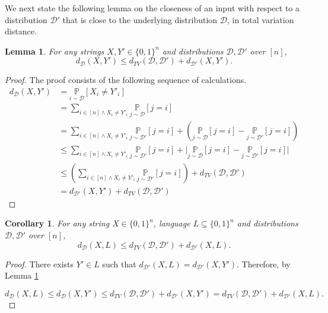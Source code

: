 \documentclass[11pt]{article}
\newtheorem{lemma}[theorem]{Lemma}
\newtheorem{corollary}[theorem]{Corollary}
\newcommand{\sD}{\mathcal{D}}
\begin{document}
We next state the following lemma on the closeness of an input with respect to a distribution $\sD'$ that is close to the underlying distribution $\sD$, in total variation distance.
\begin{lemma}\label{tvineq}
For any strings $X,Y' \in\{0,1\}^{n}$ and distributions $\mathcal{D}, \mathcal{D}'$ over $[n]$,
\begin{equation*}
    d_{\mathcal{D}}(X,Y')\leq d_{TV}(\mathcal{D},\mathcal{D}')+d_{\mathcal{D}'}(X,Y').
\end{equation*}
\end{lemma}

\begin{proof} The proof consists of the following sequence of calculations.
\[
\begin{split}
    d_{\mathcal{D}}(X,Y') &= \underset{i\sim\mathcal{D}}{\mathbb{P}}\left [X_{i}\neq Y'_{i}\right]\\
    &= \sum_{i\in [n]\wedge X_{i}\neq Y'_{i}}\underset{j\sim\mathcal{D}}{\mathbb{P}}\left[j=i\right]\\
    &= \sum_{i\in [n]\wedge X_{i}\neq Y'_{i}}\underset{j\sim\mathcal{D}'}{\mathbb{P}}\left[j=i\right] + \left( \underset{j\sim\mathcal{D}}{\mathbb{P}}\left[j=i\right]-\underset{j\sim\mathcal{D}'}{\mathbb{P}}\left[j=i\right] \right)\\
    &\leq \sum_{i\in [n]\wedge X_{i}\neq Y'_{i}}\underset{j\sim\mathcal{D}'}{\mathbb{P}}\left[j=i\right] +\bigg\vert\underset{j\sim\mathcal{D}}{\mathbb{P}}\left[j=i\right]-\underset{j\sim\mathcal{D}'}{\mathbb{P}}\left[j=i\right]\bigg\vert\\
    &\leq \left( \sum_{i\in [n]\wedge X_{i}\neq Y'_{i}}\underset{j\sim\mathcal{D}'}{\mathbb{P}}\left[j=i\right]\right) +d_{TV}(\mathcal{D},\mathcal{D}')\\
    &= d_{\mathcal{D}'}(X,Y')+d_{TV}(\mathcal{D},\mathcal{D}')
\end{split}
\]
\end{proof}

\begin{corollary}\label{tvineqLang}
    For any string $X \in\{0,1\}^{n}$, language $L\subseteq\{0,1\}^{n}$ and distributions $\mathcal{D}, \mathcal{D}'$ over $[n]$,
\begin{equation*}
    d_{\mathcal{D}}(X,L)\leq d_{TV}(\mathcal{D},\mathcal{D}')+d_{\mathcal{D}'}(X,L).
\end{equation*}
\end{corollary}

\begin{proof}
    There exists $Y'\in L$ such that $d_{\mathcal{D}'}(X,L)=d_{\mathcal{D}'}(X,Y')$. Therefore, by Lemma \ref{tvineq}

    \begin{equation*}
    d_{\mathcal{D}}(X,L)\leq d_{\mathcal{D}}(X,Y')\leq d_{TV}(\mathcal{D},\mathcal{D}')+d_{\mathcal{D}'}(X,Y')=d_{TV}(\mathcal{D},\mathcal{D}')+d_{\mathcal{D}'}(X,L).
\end{equation*}
\end{proof}
\end{document}
